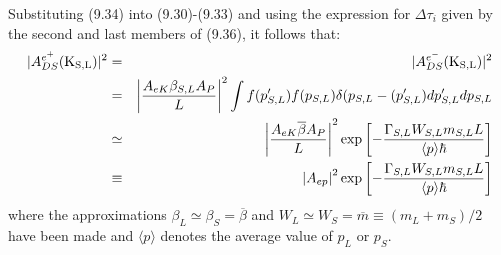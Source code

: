 {   \par Substituting (9.34) into (9.30)-(9.33) and using the expression for $\Delta \tau_i$ given 
 by the second and last members of (9.36), it follows that: 
     \begin{eqnarray}
    |A_{DS}^{e^+}({\rm K_{S,L}})|^2 &  = & |A_{DS}^{e^-}({\rm K_{S,L}})|^2 \nonumber \\
   &  = &  \left|\frac{A_{eK} \beta_{S,L} A_P }{L}\right|^2
     \int f(p'_{S,L})  f(p_{S,L}) \delta(p_{S,L}- (p'_{S,L}) dp'_{S,L} dp_{S,L} \nonumber \\
     & \simeq &  \left|\frac{A_{eK}\overline{\beta} A_P }{L}\right|^2
    \exp \left[-\frac{\Gamma_{S,L} W_{S,L}m_{S,L} L}{\langle p \rangle \hbar}\right] \nonumber \\
     & \equiv &  \left| A_{ep}\right|^2 
 \exp \left[-\frac{\Gamma_{S,L} W_{S,L}m_{S,L} L}{\langle p \rangle \hbar}\right]
    \end{eqnarray}
    where the approximations $\beta_L \simeq \beta_S = \overline{\beta}$ and 
    $W_L \simeq W_S = \overline{m} \equiv (m_L+m_S)/2$ have been made and $\langle p \rangle$ denotes 
   the average value of $p_L$ or $p_S$. 
 
}

